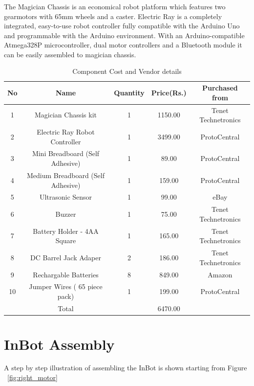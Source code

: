 The Magician Chassis is an economical robot platform which features two gearmotors with 65mm wheels and a caster. Electric Ray is a completely integrated, easy-to-use robot controller fully compatible with the Arduino Uno and programmable with the Arduino environment. With an Arduino-compatible Atmega328P microcontroller, dual motor controllers and a Bluetooth module it can be easily assembled to magician chassis.

\begin{table}[!htbp]
\centering
\caption{Component Cost and Vendor details}
\label{tab:cost}
\vspace{2mm}
 \begin{tabular}{||c c c c c ||} 
 \hline
 No & Name & Quantity & Price(Rs.) & Purchased from \\ [0.5ex] 
 \hline\hline
 1 & Magician Chassis kit & 1 & 1150.00 & Tenet Technetronics \\ 
 \hline
 2 & Electric Ray Robot Controller & 1 & 3499.00 & ProtoCentral \\ 
 \hline
 3 & Mini Breadboard (Self Adhesive) & 1 & 89.00 & ProtoCentral \\ 
 \hline
 4 & Medium Breadboard (Self Adhesive) & 1 & 159.00 & ProtoCentral \\ 
 \hline
 5 & Ultrasonic Sensor & 1 & 99.00 & eBay \\ 
 \hline
 6 & Buzzer & 1 & 75.00 & Tenet Technetronics \\ 
 \hline
 7 & Battery Holder - 4AA Square & 1 & 165.00 & Tenet Technetronics \\ 
 \hline
 8 & DC Barrel Jack Adaper & 2 & 186.00 &  Tenet Technetronics \\ 
 \hline
 9 & Rechargable Batteries & 8 & 849.00 & Amazon \\ 
 \hline
 10 & Jumper Wires ( 65 piece pack) & 1 & 199.00 & ProtoCentral \\ 
 \hline\hline
  & Total &  & 6470.00 &  \\ 
 \hline
\end{tabular}
\end{table}

\section{InBot Assembly}

A step by step illustration of assembling the InBot is shown starting from Figure ~\ref{fig:right_motor}

